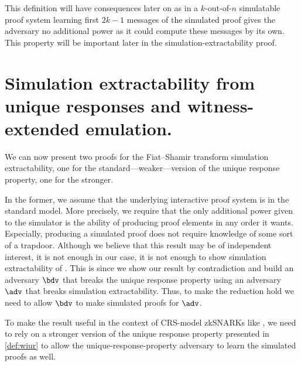 \documentclass[runningheads,11pt]{llncs}
\theoremstyle{definition}
\begin{document}
This definition will have consequences later on as in a $k$-out-of-$n$ simulatable proof system learning first $2k - 1$ messages of the simulated proof gives the adversary no additional power as it could compute these messages by its own. 
This property will be important later in the simulation-extractability proof.

\section
{Simulation extractability from unique responses and witness-extended emulation.}
We can now present two proofs for the Fiat--Shamir transform simulation extractability, one for the standard---weaker---version of the unique response property, one for the stronger.

In the former, we assume that the underlying interactive proof system is in the standard model. More precisely, we require that the only additional power given to the simulator is the ability of producing proof elements in any order it wants. Especially, producing a simulated proof does not require knowledge of some sort of a trapdoor.
Although we believe that this result may be of independent interest, it is not enough in our case, it is not enough to show simulation extractability of \plonk.
This is since we show our result by contradiction and build an adversary $\bdv$ that breaks the unique response property using an adversary $\adv$ that breaks simulation extractability. Thus, to make the reduction hold we need to allow $\bdv$ to make simulated proofs for $\adv$.

To make the result useful in the context of CRS-model zkSNARKs like \plonk, we need to rely on a stronger version of the unique response property presented in \cref{def:wiur} to allow the unique-response-property adversary to learn the simulated proofs as well.
\end{document}
